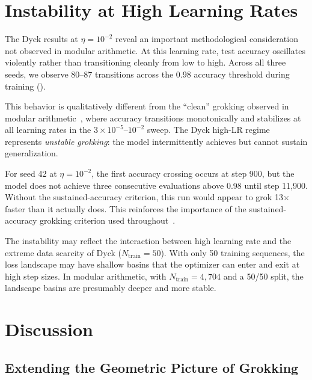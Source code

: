 \documentclass[11pt]{article}
\begin{document}
\section{Instability at High Learning Rates}
\label{sec:instability}

The Dyck results at $\eta = 10^{-2}$ reveal an important methodological consideration not observed in modular arithmetic. At this learning rate, test accuracy oscillates violently rather than transitioning cleanly from low to high. Across all three seeds, we observe 80--87 transitions across the 0.98 accuracy threshold during training ().

This behavior is qualitatively different from the ``clean'' grokking observed in modular arithmetic~\citep{xu2026integrability, power2022grokking}, where accuracy transitions monotonically and stabilizes at all learning rates in the $3 \times 10^{-5}$--$10^{-2}$ sweep. The Dyck high-LR regime represents \emph{unstable grokking}: the model intermittently achieves but cannot sustain generalization.

For seed 42 at $\eta = 10^{-2}$, the first accuracy crossing occurs at step 900, but the model does not achieve three consecutive evaluations above 0.98 until step 11,900. Without the sustained-accuracy criterion, this run would appear to grok 13$\times$ faster than it actually does. This reinforces the importance of the sustained-accuracy grokking criterion used throughout~\citep{xu2026integrability}.

The instability may reflect the interaction between high learning rate and the extreme data scarcity of Dyck ($N_{\text{train}} = 50$). With only 50 training sequences, the loss landscape may have shallow basins that the optimizer can enter and exit at high step sizes. In modular arithmetic, with $N_{\text{train}} = 4{,}704$ and a 50/50 split, the landscape basins are presumably deeper and more stable.


\section{Discussion}
\label{sec:discussion}

\subsection{Extending the Geometric Picture of Grokking}
\end{document}

